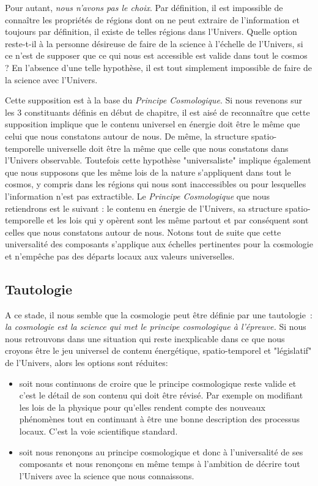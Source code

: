 Pour autant, \textit{nous n'avons pas le choix}. Par définition, il est impossible de connaître les propriétés de régions dont on ne peut extraire de l'information et toujours par définition, il existe de telles régions dans l'Univers. Quelle option reste-t-il à la personne désireuse de faire de la science à l'échelle de l'Univers, si ce n'est de supposer que ce qui nous est accessible est valide dans tout le cosmos ? En l'absence d'une telle hypothèse, il est tout simplement impossible de faire de la science avec l'Univers.

Cette supposition est à la base du \textit{Principe Cosmologique}. Si nous revenons sur les 3 constituants définis en début de chapitre, il est aisé de reconnaître que cette supposition implique que le contenu universel en énergie doit être le même que celui que nous constatons autour de nous. De même, la structure spatio-temporelle universelle doit être la même que celle que nous constatons dans l'Univers observable. Toutefois cette hypothèse "universaliste" implique également que nous supposons que les même lois de la nature s'appliquent dans tout le cosmos, y compris dans les régions qui nous sont inaccessibles ou pour lesquelles l'information n'est pas extractible. Le \textit{Principe Cosmologique} que nous retiendrons est le suivant : le contenu en énergie de l'Univers, sa structure spatio-temporelle et les lois qui y opèrent sont les même partout et par conséquent sont celles que nous constatons autour de nous. Notons tout de suite que cette universalité des composants s'applique aux échelles pertinentes pour la cosmologie et n'empêche pas des départs locaux aux valeurs universelles.

\subsection{Tautologie}

A ce stade, il nous semble que la cosmologie peut être définie par une tautologie~: \textit{la cosmologie est la science qui met le principe cosmologique à l'épreuve.} Si nous nous retrouvons dans une situation qui reste inexplicable dans ce que nous croyons être le jeu universel de contenu énergétique, spatio-temporel et "législatif" de l'Univers, alors les options sont réduites:
\begin{itemize}
\item soit nous continuons de croire que le principe cosmologique reste valide et c'est le détail de son contenu qui doit être révisé. Par exemple on modifiant les lois de la physique pour qu'elles rendent compte des nouveaux phénomènes tout en continuant à être une bonne description des processus locaux. C'est la voie scientifique standard.
\item soit nous renonçons au principe cosmologique et donc à l'universalité de ses composants et nous renonçons en même temps à l'ambition de décrire tout l'Univers avec la science que nous connaissons.
\end{itemize}


